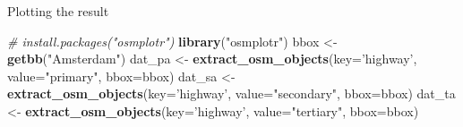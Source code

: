 \documentclass[ignorenonframetext,]{beamer}
\newenvironment{Shaded}{\begin{snugshade}}{\end{snugshade}}
\newcommand{\KeywordTok}[1]{\textcolor[rgb]{0.13,0.29,0.53}{\textbf{#1}}}
\newcommand{\DataTypeTok}[1]{\textcolor[rgb]{0.13,0.29,0.53}{#1}}
\newcommand{\StringTok}[1]{\textcolor[rgb]{0.31,0.60,0.02}{#1}}
\newcommand{\CommentTok}[1]{\textcolor[rgb]{0.56,0.35,0.01}{\textit{#1}}}
\newcommand{\OperatorTok}[1]{\textcolor[rgb]{0.81,0.36,0.00}{\textbf{#1}}}
\newcommand{\NormalTok}[1]{#1}
\begin{document}
\begin{frame}[fragile]{Plotting the result}

\begin{Shaded}
\begin{Highlighting}[]
\CommentTok{# install.packages("osmplotr")}
\KeywordTok{library}\NormalTok{(}\StringTok{"osmplotr"}\NormalTok{)}
\NormalTok{bbox <-}\StringTok{ }\KeywordTok{getbb}\NormalTok{(}\StringTok{"Amsterdam"}\NormalTok{)}
\NormalTok{dat_pa <-}\StringTok{ }\KeywordTok{extract_osm_objects}\NormalTok{(}\DataTypeTok{key=}\StringTok{'highway'}\NormalTok{, }
                              \DataTypeTok{value=}\StringTok{"primary"}\NormalTok{,}
                              \DataTypeTok{bbox=}\NormalTok{bbox)}
\NormalTok{dat_sa <-}\StringTok{ }\KeywordTok{extract_osm_objects}\NormalTok{(}\DataTypeTok{key=}\StringTok{'highway'}\NormalTok{, }
                              \DataTypeTok{value=}\StringTok{"secondary"}\NormalTok{,}
                              \DataTypeTok{bbox=}\NormalTok{bbox)}
\NormalTok{dat_ta <-}\StringTok{ }\KeywordTok{extract_osm_objects}\NormalTok{(}\DataTypeTok{key=}\StringTok{'highway'}\NormalTok{, }
                              \DataTypeTok{value=}\StringTok{"tertiary"}\NormalTok{,}
                              \DataTypeTok{bbox=}\NormalTok{bbox)}
\end{Highlighting}
\end{Shaded}

\begin{Shaded}
\end{Shaded}

\end{frame}
\end{document}
